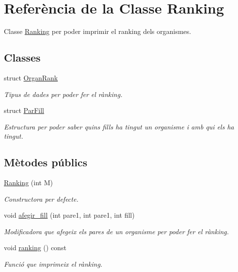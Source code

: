\hypertarget{class_ranking}{\section{Referència de la Classe Ranking}
\label{class_ranking}
}


Classe \hyperlink{class_ranking}{Ranking} per poder imprimir el ranking dels organismes.  


\subsection*{Classes}
\begin{DoxyCompactItemize}
\item 
struct \hyperlink{struct_ranking_1_1_organ_rank}{Organ\-Rank}
\begin{DoxyCompactList}\small\item\em Tipus de dades per poder fer el rànking. \end{DoxyCompactList}\item 
struct \hyperlink{struct_ranking_1_1_par_fill}{Par\-Fill}
\begin{DoxyCompactList}\small\item\em Estructura per poder saber quins fills ha tingut un organisme i amb qui els ha tingut. \end{DoxyCompactList}\end{DoxyCompactItemize}
\subsection*{Mètodes públics}
\begin{DoxyCompactItemize}
\item 
\hyperlink{class_ranking_af700e3f1e24eb35173adff4fbcac7c68}{Ranking} (int M)
\begin{DoxyCompactList}\small\item\em Constructora per defecte. \end{DoxyCompactList}\item 
void \hyperlink{class_ranking_a5d074c9ae7617aa13e13930c45578bb8}{afegir\-\_\-fill} (int pare1, int pare1, int fill)
\begin{DoxyCompactList}\small\item\em Modificadora que afegeix els pares de un organisme per poder fer el rànking. \end{DoxyCompactList}\item 
void \hyperlink{class_ranking_a2cb68818448b64432f2da6c7f3cfb446}{ranking} () const 
\begin{DoxyCompactList}\small\item\em Funció que imprimeix el rànking. \end{DoxyCompactList}\end{DoxyCompactItemize}
